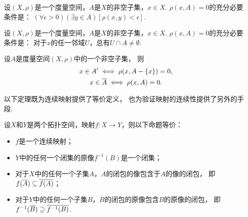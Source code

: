 \begin{theorem}
设\((X,\rho)\)是一个度量空间，\(A\)是\(X\)的非空子集，\(x \in X\).
\(\rho(x,A) = 0\)的充分必要条件是：
\((\forall\epsilon>0)(\exists y \in A)[\rho(x,y)<\epsilon]\).
\end{theorem}

\begin{corollary}
设\((X,\rho)\)是一个度量空间，\(A\)是\(X\)的非空子集，\(x \in X\).
\(\rho(x,A) = 0\)的充分必要条件是：
对于\(x\)的任一邻域\(U\)，总有\(U \cap A \neq \emptyset\).
\end{corollary}

\begin{theorem}
设\(A\)是度量空间\((X,\rho)\)中的一个非空子集，
则\begin{gather*}
	x \in A'
	\iff
	\rho(x,A-\{x\})=0, \\
	x \in \overline{A}
	\iff
	\rho(x,A)=0.
\end{gather*}
\end{theorem}

以下定理既为连续映射提供了等价定义，
也为验证映射的连续性提供了另外的手段.

\begin{theorem}
设\(X\)和\(Y\)是两个拓扑空间，映射\(f\colon X \to Y\)，则以下命题等价：
\begin{itemize}
	\item \(f\)是一个连续映射；
	\item \(Y\)中的任何一个闭集的原像\(f^{-1}(B)\)是一个闭集；
	\item 对于\(X\)中的任何一个子集\(A\)，\(A\)的闭包的像包含于\(A\)的像的闭包，
	即\(
		f(\overline{A})
		\subseteq
		\overline{f(A)}
	\)；
	\item 对于\(Y\)中的任何一个子集\(B\)，\(B\)的闭包的原像包含\(B\)的原像的闭包，
	即\(
		f^{-1}(\overline{B})
		\supseteq
		\overline{f^{-1}(B)}
	\).
\end{itemize}
\end{theorem}
